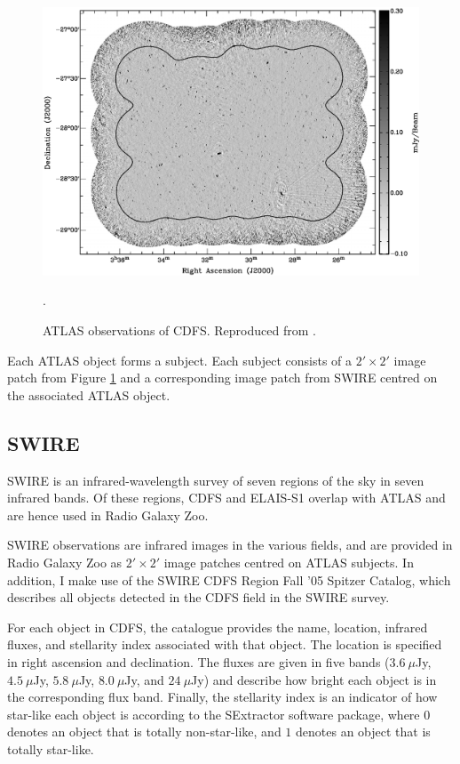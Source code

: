 \documentclass[a4paper]{article}
\newcommand{\fig}{Figure }
\begin{document}
      \begin{figure}[!ht]
        \centering
        \includegraphics[width=0.8\linewidth,]{images/ATLAS-CDFS-cropped.pdf}
        \caption{ATLAS observations of CDFS. Reproduced from \citet{franzen15}.}.
        \label{fig:cdfs}
      \end{figure}

      Each ATLAS object forms a subject. Each subject consists of a $2' \times 2'$ image patch from \fig \ref{fig:cdfs} and a corresponding image patch from SWIRE centred on the associated ATLAS object.

    \subsection{SWIRE}

      SWIRE is an infrared-wavelength survey of seven regions of the sky in seven infrared bands. Of these regions, CDFS and ELAIS-S1 overlap with ATLAS and are hence used in Radio Galaxy Zoo.

      SWIRE observations are infrared images in the various fields, and are provided in Radio Galaxy Zoo as $2' \times 2'$ image patches centred on ATLAS subjects. In addition, I make use of the SWIRE CDFS Region Fall '05 Spitzer Catalog\cite{surace05}, which describes all objects detected in the CDFS field in the SWIRE survey.

      For each object in CDFS, the catalogue provides the name, location, infrared fluxes, and stellarity index associated with that object. The location is specified in right ascension and declination. The fluxes are given in five bands ($3.6\ \mu$Jy, $4.5\ \mu$Jy, $5.8\ \mu$Jy, $8.0\ \mu$Jy, and $24\ \mu$Jy) and describe how bright each object is in the corresponding flux band. Finally, the stellarity index is an indicator of how star-like each object is according to the SExtractor software package, where $0$ denotes an object that is totally non-star-like, and $1$ denotes an object that is totally star-like\cite{surace05}.
\end{document}
